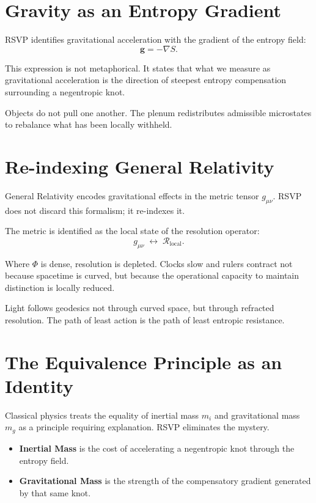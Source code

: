 \documentclass[11pt]{book}
\begin{document}
\section{Gravity as an Entropy Gradient}

RSVP identifies gravitational acceleration with the gradient of the entropy field:
\[
\mathbf{g} = - \nabla S .
\]

This expression is not metaphorical. It states that what we measure as gravitational acceleration is the direction of steepest entropy compensation surrounding a negentropic knot.

Objects do not pull one another. The plenum redistributes admissible microstates to rebalance what has been locally withheld.

\section{Re-indexing General Relativity}

General Relativity encodes gravitational effects in the metric tensor \(g_{\mu\nu}\). RSVP does not discard this formalism; it re-indexes it.

The metric is identified as the local state of the resolution operator:
\[
g_{\mu\nu} \;\longleftrightarrow\; \mathcal{R}_{\text{local}} .
\]

Where \(\Phi\) is dense, resolution is depleted. Clocks slow and rulers contract not because spacetime is curved, but because the operational capacity to maintain distinction is locally reduced.

Light follows geodesics not through curved space, but through refracted resolution. The path of least action is the path of least entropic resistance.

\section{The Equivalence Principle as an Identity}

Classical physics treats the equality of inertial mass \(m_i\) and gravitational mass \(m_g\) as a principle requiring explanation. RSVP eliminates the mystery.

\begin{itemize}
\item \textbf{Inertial Mass} is the cost of accelerating a negentropic knot through the entropy field.
\item \textbf{Gravitational Mass} is the strength of the compensatory gradient generated by that same knot.
\end{itemize}
\end{document}
